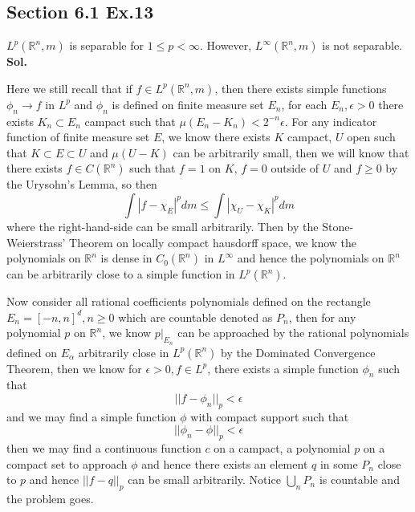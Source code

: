 \documentclass[lang=en,11pt,a4paper,citestyle =authoryear]{elegantpaper}
\newcommand{\R}{\mathbb{R}}
\begin{document}
\subsection*{Section 6.1 Ex.13} 
$L^p(\R^n,m)$ is separable for $1\leq p < \infty$. However, $L^{\infty}(\R^n,m)$ is not separable.
\vspace{0.5em}\\
\textbf{Sol.} \par
Here we still recall that if $f\in L^p(\R^n,m)$, then there exists simple functions $\phi_n \to f$ in $L^p$ and $\phi_n$ is defined on finite measure set $E_n$, for each $E_n, \epsilon > 0$ there exists $K_n \subset E_n$ campact such that $\mu(E_n-K_n) < 2^{-n}\epsilon$. For any indicator function of finite measure set $E$, we know there exists $K$ campact, $U$ open such that $K\subset E \subset U$ and $\mu(U-K)$ can be arbitrarily small, then we will know that there exists $f\in C(\R^n)$ such that $f = 1$ on $K$, $f=0$ outside of $U$ and $f\geq 0$ by the Urysohn's Lemma, so then
\[\int |f-\chi_E|^p dm \leq \int |\chi_U - \chi_K|^p dm\]
where the right-hand-side can be small arbitrarily. Then by the Stone-Weierstrass' Theorem on locally compact hausdorff space, we know the polynomials on $\R^n$ is dense in $C_0(\R^n)$ in $L^{\infty}$ and hence the polynomials on $\R^n$ can be arbitrarily close to a simple function in $L^p(\R^n)$.\par
Now consider all rational coefficients polynomials defined on the rectangle $E_{n} = [-n, n]^d,n\geq 0$ which are countable denoted as $P_n$, then for any polynomial $p$ on $\R^n$, we know $p|_{E_{n}}$ can be approached by the rational polynomials defined on $E_{\alpha}$ arbitrarily close in $L^p(\R^n)$ by the Dominated Convergence Theorem, then we know for $\epsilon > 0, f\in L^p$, there exists a simple function $\phi_n$ such that
\[||f-\phi_n||_p < \epsilon\]
and we may find a simple function $\phi$ with compact support such that
\[||\phi_n-\phi||_p < \epsilon\]
then we may find a continuous function $c$ on a campact, a polynomial $p$ on a compact set to approach $\phi$ and hence there exists an element $q$ in some $P_n$ close to $p$ and hence $||f-q||_p$ can be small arbitrarily. Notice $\bigcup_n P_n$ is countable and the problem goes.
\vspace{0.5em}
\end{document}
